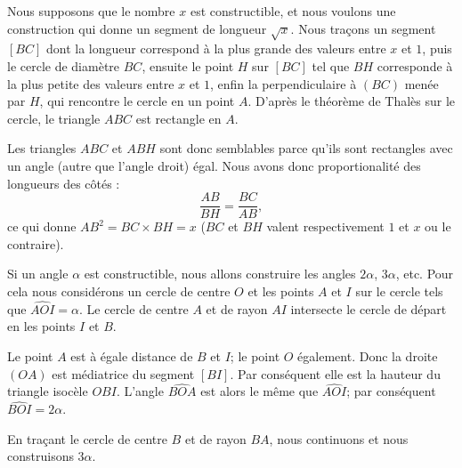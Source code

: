 \begin{example}  \label{ExTYMooSMCvSr}

    Nous supposons que le nombre \( x\) est constructible, et nous voulons une construction qui donne un segment de longueur \( \sqrt{x}\). Nous traçons un segment $[BC]$ dont la longueur correspond à la plus grande des valeurs entre $x$ et $1$, puis le cercle de diamètre $BC$, ensuite le point $H$ sur $[BC]$ tel que $BH$ corresponde à la plus petite des valeurs entre $x$ et $1$, enfin la perpendiculaire à $(BC)$ menée par $H$, qui rencontre le cercle en un point $A$. D'après le théorème de Thalès sur le cercle, le triangle $ABC$ est rectangle en $A$.

    Les triangles \( ABC\) et \( ABH\) sont donc semblables parce qu'ils sont rectangles avec un angle (autre que l'angle droit) égal. Nous avons donc proportionalité des longueurs des côtés :
    \begin{equation}
        \frac{ AB }{ BH }=\frac{ BC }{ AB },
    \end{equation}
    ce qui donne \( AB^2=BC\times BH=x\) (\( BC\) et \( BH\) valent respectivement \( 1\) et \( x\) ou le contraire).

    \begin{center}
   
    \end{center}

\end{example}

\begin{example} \label{ExAHCooELGGPa}
    Si un angle \( \alpha\) est constructible, nous allons construire les angles \( 2\alpha\), \( 3\alpha\), etc. Pour cela nous considérons un cercle de centre \( O\) et les points \( A\) et \( I\) sur le cercle tels que \( \widehat{AOI}=\alpha\). Le cercle de centre \( A\) et de rayon \( AI\) intersecte le cercle de départ en les points \( I\) et \( B\). 
    
    Le point \( A\) est à égale distance de \( B\) et \( I\); le point \( O\) également. Donc la droite \( (OA)\) est médiatrice du segment \( [BI]\). Par conséquent elle est la hauteur du triangle isocèle \( OBI\). L'angle \( \widehat{BOA}\) est alors le même que \( \widehat{AOI}\); par conséquent \( \widehat{BOI}=2\alpha\).
    
    \begin{center}
        
    \end{center}

    En traçant le cercle de centre \( B\) et de rayon \( BA\), nous continuons et nous construisons \( 3\alpha\).

\end{example}

